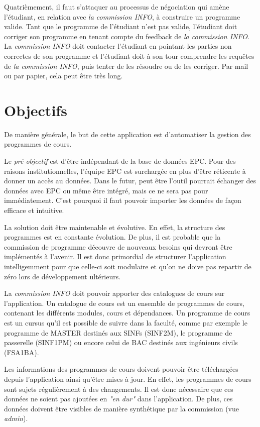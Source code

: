 Quatrièmement, il faut s'attaquer au processus de négociation qui amène l'étudiant, en relation avec \textit{la commission INFO}, à construire un programme valide. Tant que le programme de l'étudiant n'est pas valide, l'étudiant doit corriger son programme en tenant compte du feedback de \textit{la commission INFO}. La \textit{commission INFO} doit contacter l'étudiant en pointant les parties non correctes de son programme et l'étudiant doit à son tour comprendre les requêtes de \textit{la commission INFO}, puis tenter de les résoudre ou de les corriger. Par mail ou par papier, cela peut être très long. 
\clearpage


\section{Objectifs}
De manière générale, le but de cette application est d'automatiser la gestion des programmes de cours. 


Le \textit{pré-objectif} est d'être indépendant de la base de données EPC. Pour des raisons institutionnelles, l'équipe EPC est surchargée en plus d'être réticente à donner un accès au données. Dans le futur, peut être l'outil pourrait échanger des données avec EPC ou même être intégré, mais ce ne sera pas pour immédiatement. C'est pourquoi il faut pouvoir importer les données de façon efficace et intuitive.
 
La solution doit être maintenable et évolutive. En effet, la structure des programmes est en constante évolution. De plus, il est probable que la commission de programme découvre de nouveaux besoins qui devront être implémentés à l'avenir. Il est donc primordial de structurer l'application intelligemment pour que celle-ci soit modulaire et qu'on ne doive pas repartir de zéro lors de développement ultérieurs.

La \textit{commission INFO} doit pouvoir apporter des catalogues de cours sur l'application. Un catalogue de cours est un ensemble de programmes de cours, contenant les différents modules, cours et dépendances. Un programme de cours est un cursus qu'il est possible de suivre dans la faculté, comme par exemple le programme de MASTER destinés aux SINFs (SINF2M), le programme de passerelle (SINF1PM) ou encore celui de BAC destinés aux ingénieurs civils (FSA1BA).  

Les informations des programmes de cours  doivent pouvoir être téléchargées depuis l'application ainsi qu'être mises à jour. En effet, les programmes de cours sont sujets régulièrement à des changements. Il est donc nécessaire que ces données ne soient pas ajoutées en \textit{"en dur"} dans l'application. De plus, ces données doivent être visibles de manière synthétique par la commission (vue \textit{admin}).


